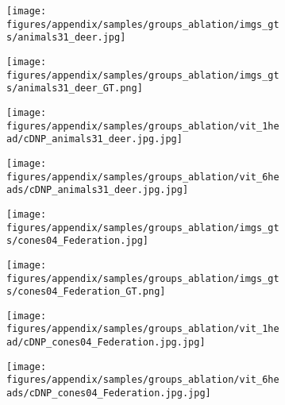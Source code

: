 \documentclass[10pt,twocolumn,letterpaper]{article}
\begin{document}
\begin{figure}[h!]
    \centering


    \begin{subfigure}[b]{0.110\textwidth}
        \centering
        \texttt{[image: figures/appendix/samples/groups\_ablation/imgs\_gts/animals31\_deer.jpg]}
    \end{subfigure}
    \begin{subfigure}[b]{0.110\textwidth}
        \centering
        \texttt{[image: figures/appendix/samples/groups\_ablation/imgs\_gts/animals31\_deer\_GT.png]}
    \end{subfigure}
    \begin{subfigure}[b]{0.110\textwidth}
        \centering
        \texttt{[image: figures/appendix/samples/groups\_ablation/vit\_1head/cDNP\_animals31\_deer.jpg.jpg]}
    \end{subfigure}
    \begin{subfigure}[b]{0.110\textwidth}
        \centering
        \texttt{[image: figures/appendix/samples/groups\_ablation/vit\_6heads/cDNP\_animals31\_deer.jpg.jpg]}
    \end{subfigure}
    


    \begin{subfigure}[b]{0.110\textwidth}
        \centering
        \texttt{[image: figures/appendix/samples/groups\_ablation/imgs\_gts/cones04\_Federation.jpg]}
    \end{subfigure}
    \begin{subfigure}[b]{0.110\textwidth}
        \centering
        \texttt{[image: figures/appendix/samples/groups\_ablation/imgs\_gts/cones04\_Federation\_GT.png]}
    \end{subfigure}
    \begin{subfigure}[b]{0.110\textwidth}
        \centering
        \texttt{[image: figures/appendix/samples/groups\_ablation/vit\_1head/cDNP\_cones04\_Federation.jpg.jpg]}
    \end{subfigure}
    \begin{subfigure}[b]{0.110\textwidth}
        \centering
        \texttt{[image: figures/appendix/samples/groups\_ablation/vit\_6heads/cDNP\_cones04\_Federation.jpg.jpg]}
    \end{subfigure}
    

\end{figure}
\end{document}
